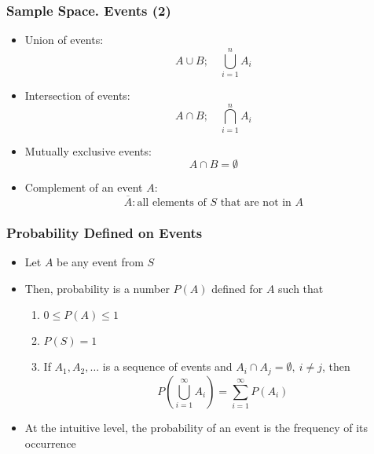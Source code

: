 \documentclass[10pt]{beamer}
\theoremstyle{definition}
\begin{document}
\begin{frame}[fragile]
\frametitle{Sample Space. Events (2)}
\begin{itemize}
	\item Union of events:
	\[
		A \cup B; \quad \bigcup_{i=1}^{n}A_{i}
	\]
	
	\item Intersection of events:
	\[
		A \cap B; \quad \bigcap_{i=1}^{n}A_{i}
	\]
	
	\item Mutually exclusive events:
	\[
		A \cap B = \emptyset
	\]
		
	\item Complement of an event $ A $:
	\[
		\overline A : \textrm{all elements of } S \textrm{ that are not in } A
	\]
\end{itemize}
\end{frame}

\begin{frame}[fragile]
\frametitle{Probability Defined on Events}
\begin{itemize}
	\item Let $ A $ be any event from $ S $
		
	\item Then, probability is a number $ P(A) $ defined for $ A $ such that
	\begin{enumerate}
		\item $ 0 \leq P(A) \leq 1 $
			
		\item $ P(S) = 1 $
			
		\item If $ A_{1}, A_{2}, \ldots $ is a sequence of events and $ A_{i}\cap A_{j} = \emptyset, \ i \neq j $, then
		\[
			P\left(\bigcup_{i=1}^{\infty}A_{i}\right) = \sum_{i=1}^{\infty} P(A_{i}) 
		\]
	\end{enumerate}
	
	\item At the intuitive level, the probability of an event is the frequency of its occurrence
\end{itemize}
\end{frame}
\end{document}
